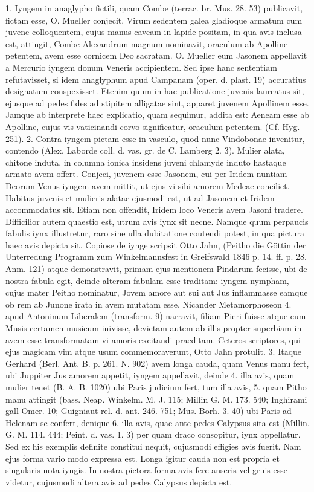\documentclass[a4paper, 11pt, oneside, polutonikogreek, german]{article}
\begin{document}
1. Iyngem in anaglypho fictili, quam Combe (terrac. br. Mus. 28. 53) publicavit, fictam esse, O. Mueller conjecit. Virum sedentem galea gladioque armatum cum juvene colloquentem, cujus manus caveam in lapide positam, in qua avis inclusa est, attingit, Combe Alexandrum magnum nominavit, oraculum ab Apolline petentem, avem esse cornicem Deo sacratam. O. Mueller eum Jasonem appellavit a Mercurio iyngem donum Veneris accipientem. Sed ipse hanc sententiam refutavisset, si idem anaglyphum apud Campanam (oper. d. plast. 19) accuratius designatum conspexisset. Etenim quum in hac publicatione juvenis laureatus sit, ejusque ad pedes fides ad stipitem alligatae sint, apparet juvenem Apollinem esse. Jamque ab interprete haec explicatio, quam sequimur, addita est: Aeneam esse ab Apolline, cujus vis vaticinandi corvo significatur, oraculum petentem. (Cf. Hyg. 251). 2. Contra iyngem pictam esse in vasculo, quod nunc Vindobonae invenitur, contendo (Alex. Laborde coll. d. vas. gr. de C. Lamberg 2. 3). Mulier alata, chitone induta, in columna ionica insidens juveni chlamyde induto hastaque armato avem offert. Conjeci, juvenem esse Jasonem, cui per Iridem nuntiam Deorum Venus iyngem avem mittit, ut ejus vi sibi amorem Medeae conciliet. Habitus juvenis et mulieris alatae ejusmodi est, ut ad Jasonem et Iridem accommodatus sit. Etiam non offendit, Iridem loco Veneris avem Jasoni tradere. Difficilior autem quaestio est, utrum avis iynx sit necne. Namque quum perpaucis fabulis iynx illustretur, raro sine ulla dubitatione coutendi potest, in qua pictura haec avis depicta sit. Copiose de iynge scripsit Otto Jahn, (Peitho die Göttin der Unterredung Programm zum Winkelmannsfest in Greifswald 1846 p. 14. ff. p. 28. Anm. 121) atque demonstravit, primam ejus mentionem Pindarum fecisse, ubi de nostra fabula egit, deinde alteram fabulam esse traditam: iyngem nympham, cujus mater Peitho nominatur, Jovem amore aut sui aut Jus inflammasse eamque ob rem ab Junone irata in avem mutatam esse. Nicander Metamorphoseon 4. apud Antoninum Liberalem (transform. 9) narravit, filiam Pieri fuisse atque cum Musis certamen musicum inivisse, devictam autem ab illis propter superbiam in avem esse transformatam vi amoris excitandi praeditam. Ceteros scriptores, qui ejus magicam vim atque usum commemoraverunt, Otto Jahn protulit. 3. Itaque Gerhard (Berl. Ant. B. p. 261. N. 902) avem longa cauda, quam Venus manu fert, ubi Juppiter Jus amorem appetit, iyngem appellavit, deinde 4. illa avis, quam mulier tenet (B. A. B. 1020) ubi Paris judicium fert, tum illa avis, 5. quam Pitho manu attingit (bass. Neap. Winkelm. M. J. 115; Millin G. M. 173. 540; Inghirami gall Omer. 10; Guigniaut rel. d. ant. 246. 751; Mus. Borh. 3. 40) ubi Paris ad Helenam se confert, denique 6. illa avis, quae ante pedes Calypsus sita est (Millin. G. M. 114. 444; Peint. d. vas. 1. 3) per quam draco consopitur, iynx appellatur. Sed ex his exemplis definite constitui nequit, cujusmodi effigies avis fuerit. Nam ejus forma vario modo expressa est. Longa igitur cauda non est propria et singularis nota iyngis. In nostra pictora forma avis fere anseris vel gruis esse videtur, cujusmodi altera avis ad pedes Calypsus depicta est.
\end{document}

